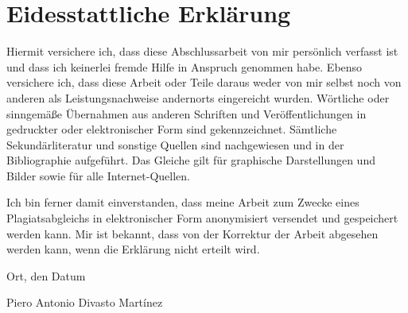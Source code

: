 \chapter*{Eidesstattliche Erkl\"{a}rung}
\thispagestyle{empty}
Hiermit versichere ich, dass diese Abschlussarbeit von mir persönlich verfasst
ist und dass ich keinerlei fremde Hilfe in Anspruch genommen habe. Ebenso
versichere ich, dass diese Arbeit oder Teile daraus weder von mir selbst noch
von anderen als Leistungsnachweise andernorts eingereicht wurden. Wörtliche oder
sinn\-gemäße Übernahmen aus anderen Schriften und Veröffentlichungen in gedruckter
oder elektronischer Form sind gekennzeichnet. Sämtliche Sekundärliteratur und
sonstige Quellen sind nachgewiesen und in der Bibliographie aufgeführt. Das
Glei\-che gilt für graphische Darstellungen und Bilder sowie für alle
Internet-Quellen.

Ich bin ferner damit einverstanden, dass meine Arbeit zum Zwecke eines
Plagiatsabgleichs in elektronischer Form anonymisiert versendet und gespeichert
werden kann. Mir ist bekannt, dass von der Korrektur der Arbeit abgesehen werden
kann, wenn die Erklärung nicht erteilt wird.
\bigskip

\raggedright{Ort, den Datum} \bigskip \bigskip \bigskip

Piero Antonio Divasto Martínez